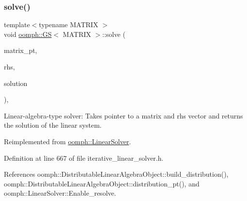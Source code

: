 \mbox{\label{classoomph_1_1GS_a889f33af686aab8649b5ef68bf061681}} 
\subsubsection{\texorpdfstring{solve()}{solve()}\hspace{0.1cm}{\footnotesize\ttfamily [2/3]}}
{\footnotesize\ttfamily template$<$typename M\+A\+T\+R\+IX $>$ \\
void \hyperlink{classoomph_1_1GS}{oomph\+::\+GS}$<$ M\+A\+T\+R\+IX $>$\+::solve (\begin{DoxyParamCaption}\item[{\hyperlink{classoomph_1_1DoubleMatrixBase}{Double\+Matrix\+Base} $\ast$const \&}]{matrix\+\_\+pt,  }\item[{const \hyperlink{classoomph_1_1DoubleVector}{Double\+Vector} \&}]{rhs,  }\item[{\hyperlink{classoomph_1_1DoubleVector}{Double\+Vector} \&}]{solution }\end{DoxyParamCaption})\hspace{0.3cm}{\ttfamily [inline]}, {\ttfamily [virtual]}}



Linear-\/algebra-\/type solver\+: Takes pointer to a matrix and rhs vector and returns the solution of the linear system. 



Reimplemented from \hyperlink{classoomph_1_1LinearSolver_a546c09822d18191df14caed864c04c09}{oomph\+::\+Linear\+Solver}.



Definition at line 667 of file iterative\+\_\+linear\+\_\+solver.\+h.



References oomph\+::\+Distributable\+Linear\+Algebra\+Object\+::build\+\_\+distribution(), oomph\+::\+Distributable\+Linear\+Algebra\+Object\+::distribution\+\_\+pt(), and oomph\+::\+Linear\+Solver\+::\+Enable\+\_\+resolve.

\mbox{\label{classoomph_1_1GS_a7fb932f50b127b44208c0dee295e6bd8}} 
